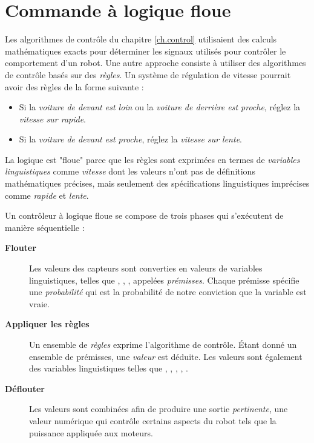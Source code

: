 
\chapter{Commande à logique floue}\label{ch.fuzzy}

Les algorithmes de contrôle du chapitre \ref{ch.control} utilisaient des calculs mathématiques exacts pour déterminer les signaux utilisés pour contrôler le comportement d'un robot. Une autre approche consiste à utiliser des algorithmes de contrôle basés sur des \emph{règles}. Un système de régulation de vitesse pourrait avoir des règles de la forme suivante :
\begin{itemize}
\item Si la \emph{voiture de devant est loin} ou la \emph{voiture de derrière est proche}, réglez la \emph{vitesse sur rapide}.
\item Si la \emph{voiture de devant est proche}, réglez la \emph{vitesse sur lente}.
\end{itemize}
La logique est "floue" parce que les règles sont exprimées en termes de \emph{variables linguistiques} comme \emph{vitesse} dont les valeurs n'ont pas de définitions mathématiques précises, mais seulement des spécifications linguistiques imprécises comme \emph{rapide} et \emph{lente}.

Un contrôleur à logique floue se compose de trois phases qui s'exécutent de manière séquentielle :
\begin{description}
\item[\textbf{Flouter}] Les valeurs des capteurs sont converties en valeurs de variables linguistiques, telles que , , , appelées \emph{prémisses}. Chaque prémisse spécifie une \emph{probabilité} qui est la probabilité de notre conviction que la variable est vraie.
\item[\textbf{Appliquer les règles}] Un ensemble de \emph{règles} exprime l'algorithme de contrôle. Étant donné un ensemble de prémisses, une \emph{valeur} est déduite. Les valeurs sont également des variables linguistiques telles que , , , , .
\item[\textbf{Déflouter}] Les valeurs sont combinées afin de produire une sortie \emph{pertinente}, une valeur numérique qui contrôle certains aspects du robot tels que la puissance appliquée aux moteurs.
\end{description}

